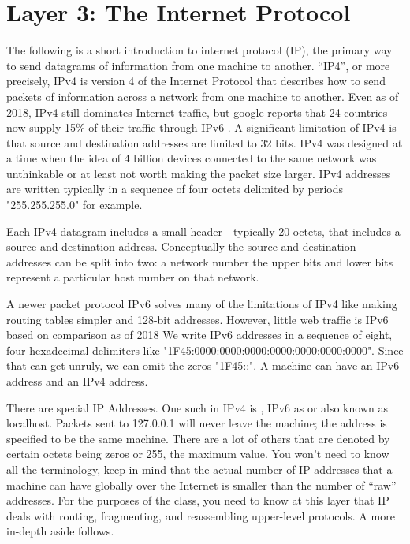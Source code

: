 \section{Layer 3: The Internet Protocol}

The following is a short introduction to internet protocol (IP), the primary way to send datagrams of information from one machine to another.
``IP4'', or more precisely, \gls{IPv4} is version 4 of the Internet Protocol that describes how to send \gls{packets} of information across a network from one machine to another.
Even as of 2018, IPv4 still dominates Internet traffic, but google reports that 24 countries now supply 15\% of their traffic through IPv6 \cite{internet_society_2018}.
A significant limitation of IPv4 is that source and destination addresses are limited to 32 bits.
IPv4 was designed at a time when the idea of 4 billion devices connected to the same network was unthinkable or at least not worth making the packet size larger.
\gls{IPv4 addresses} are written typically in a sequence of four octets delimited by periods "255.255.255.0" for example.

Each IPv4 \gls{datagram} includes a small header - typically 20 \gls{octets}, that includes a source and destination address.
Conceptually the source and destination addresses can be split into two: a network number the upper bits and lower bits represent a particular host number on that network.

A newer packet protocol \gls{IPv6} solves many of the limitations of IPv4 like making routing tables simpler and 128-bit addresses.
However, little web traffic is IPv6 based on comparison as of 2018 \cite{internet_society_2018}
We write IPv6 addresses in a sequence of eight, four hexadecimal delimiters like "1F45:0000:0000:0000:0000:0000:0000:0000".
Since that can get unruly, we can omit the zeros "1F45::". A machine can have an IPv6 address and an IPv4 address.

There are special IP Addresses.
One such in IPv4 is , IPv6 as  or  also known as localhost.
Packets sent to 127.0.0.1 will never leave the machine; the address is specified to be the same machine.
There are a lot of others that are denoted by certain octets being zeros or 255, the maximum value. You won't need to know all the terminology, keep in mind that the actual number of IP addresses that a machine can have globally over the Internet is smaller than the number of ``raw'' addresses.
For the purposes of the class, you need to know at this layer that IP deals with routing, fragmenting, and reassembling upper-level protocols. A more in-depth aside follows.

